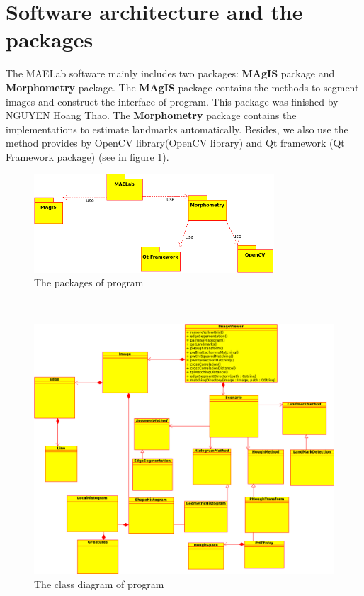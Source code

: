 \section{Software architecture and the packages}
The MAELab software mainly includes two packages: \textbf{MAgIS} package and \textbf{Morphometry} package. The \textbf{MAgIS} package contains the methods to segment images and construct the interface of program. This package was finished by NGUYEN Hoang Thao. The \textbf{Morphometry} package contains the implementations to estimate landmarks automatically. Besides, we also use the method provides by OpenCV library(OpenCV library) and Qt framework (Qt Framework package) (see in figure \ref{fig:42}).
\begin{figure}[h!]
\centering
\includegraphics[width=0.8\textwidth]{./images/packages}
\caption{The packages of program}
\label{fig:42}
\end{figure}~\\
\begin{figure}[h!]
\centering
\includegraphics[width=1.1\textwidth]{./images/main}
\caption{The class diagram of program}
\label{fig:43}
\end{figure}

